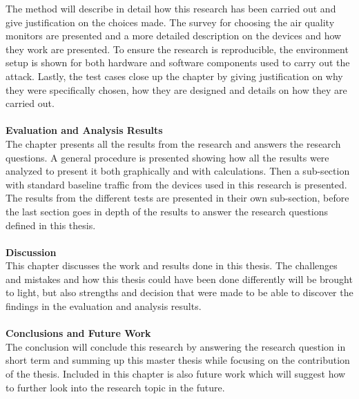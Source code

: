 The method will describe in detail how this research has been carried out and give justification on the choices made. The survey for choosing the air quality monitors are presented and a more detailed description on the devices and how they work are presented. To ensure the research is reproducible, the environment setup is shown for both hardware and software components used to carry out the attack. Lastly, the test cases close up the chapter by giving justification on why they were specifically chosen, how they are designed and details on how they are carried out. 
\\\\
\textbf{Evaluation and Analysis Results}
\\
The chapter presents all the results from the research and answers the research questions. A general procedure is presented showing how all the results were analyzed to present it both graphically and with calculations. Then a sub-section with standard baseline traffic from the devices used in this research is presented. The results from the different tests are presented in their own sub-section, before the last section goes in depth of the results to answer the research questions defined in this thesis.  
\\\\
\textbf{Discussion}
\\
This chapter discusses the work and results done in this thesis. The challenges and mistakes and how this thesis could have been done differently will be brought to light, but also strengths and decision that were made to be able to discover the findings in the evaluation and analysis results. 
\\\\
\textbf{Conclusions and Future Work}
\\
The conclusion will conclude this research by answering the research question in short term and summing up this master thesis while focusing on the contribution of the thesis. Included in this chapter is also future work which will suggest how to further look into the research topic in the future.